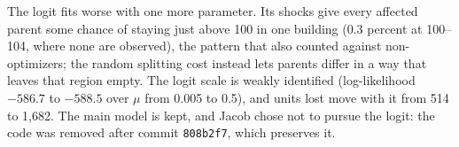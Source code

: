 The logit fits worse with one more parameter. Its shocks give every affected
parent some chance of staying just above 100 in one building (0.3 percent at
100--104, where none are observed), the pattern that also counted against
non-optimizers; the random splitting cost instead lets parents differ in a
way that leaves that region empty. The logit scale is weakly identified
(log-likelihood $-586.7$ to $-588.5$ over $\mu$ from 0.005 to 0.5), and units
lost move with it from 514 to 1,682. The main model is kept, and Jacob chose
not to pursue the logit: the code was removed after commit \texttt{808b2f7},
which preserves it.
